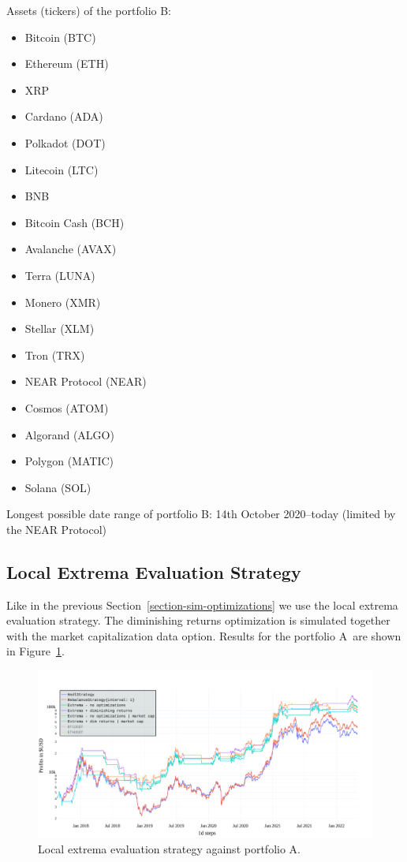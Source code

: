 Assets (tickers) of the portfolio B:
\begin{itemize}
    \item Bitcoin (BTC)
    \item Ethereum (ETH)
    \item XRP
    \item Cardano (ADA)
    \item Polkadot (DOT)
    \item Litecoin (LTC)
    \item BNB
    \item Bitcoin Cash (BCH)
    \item Avalanche (AVAX)
    \item Terra (LUNA)
    \item Monero (XMR)
    \item Stellar (XLM)
    \item Tron (TRX)
    \item NEAR Protocol (NEAR)
    \item Cosmos (ATOM)
    \item Algorand (ALGO)
    \item Polygon (MATIC)
    \item Solana (SOL)

\end{itemize}
Longest possible date range of portfolio B: 14th October 2020--today (limited by the NEAR Protocol)

\subsection*{Local Extrema Evaluation Strategy}
Like in the previous Section~\ref{section-sim-optimizations} we use the local extrema evaluation strategy. The diminishing returns optimization is simulated together with the market capitalization data option. Results for the portfolio A~are shown in Figure~\ref{figure-extrema-portfolio-A}.

\begin{figure}[!t]
    \centering
    \includegraphics[width=\columnwidth]{figures/extrema-portfolio-A.pdf}
    \caption{Local extrema evaluation strategy against portfolio A.}
    \label{figure-extrema-portfolio-A}
\end{figure}

